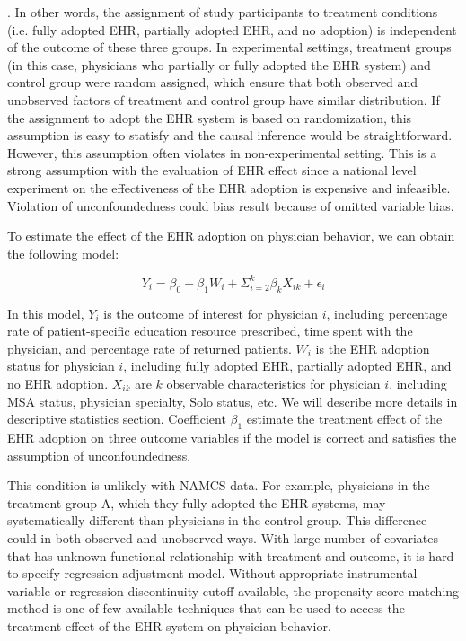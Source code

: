 \documentclass[12pt]{report}
\begin{document}
 \citep{imbens2008recent}. In other words, the assignment of study participants to treatment conditions (i.e. fully adopted EHR, partially adopted EHR, and no adoption) is independent of the outcome of these three groups. In experimental settings, treatment groups (in this case, physicians who partially or fully adopted the EHR system) and control group were random assigned, which ensure that both observed and unobserved factors of treatment and control group have similar distribution. If the assignment to adopt the EHR system is based on randomization, this assumption is easy to statisfy and the causal inference would be straightforward. However, this assumption often violates in non-experimental setting. This is a strong assumption with the evaluation of EHR effect since a national level experiment on the effectiveness of the EHR adoption is expensive and infeasible. Violation of unconfoundedness could bias result because of omitted variable bias.

To estimate the effect of the EHR adoption on physician behavior, we can obtain the following model:

\begin{equation*}
Y_{i} = \beta_0 + \beta_1 W_i + \Sigma^k_{i=2} \beta_k X_{ik} + \epsilon_{i}
\end{equation*}

In this model, $Y_{i}$ is the outcome of interest for physician $i$, including percentage rate of patient-specific education resource prescribed, time spent with the physician, and percentage rate of returned patients. $W_i$ is the EHR adoption status for physician $i$, including fully adopted EHR, partially adopted EHR, and no EHR adoption. $X_{ik}$ are $k$ observable characteristics for physician $i$, including MSA status, physician specialty, Solo status, etc. We will describe more details in descriptive statistics section. Coefficient $\beta_1$ estimate the treatment effect of the EHR adoption on three outcome variables if the model is correct and satisfies the assumption of unconfoundedness. 

This condition is unlikely with NAMCS data. For example, physicians in the treatment group A, which they fully adopted the EHR systems, may systematically different than physicians in the control group. This difference could in both observed and unobserved ways. With large number of covariates that has unknown functional relationship with treatment and outcome, it is hard to specify regression adjustment model. Without appropriate instrumental variable or regression discontinuity cutoff available, the propensity score matching method is one of few available techniques that can be used to access the treatment effect of the EHR system on physician behavior.
\end{document}
